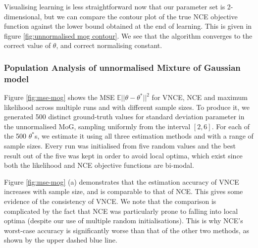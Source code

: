 \documentclass[11pt, oneside]{article}
\theoremstyle{definition}
\begin{document}
Visualising learning is less straightforward now that our parameter set is 2-dimensional, but we can compare the contour plot of the true NCE objective function against the lower bound obtained at the end of learning. This is given in figure \ref{fig:unnormalised mog contour}. We see that the algorithm converges to the correct value of $\theta$, and correct normalising constant.


\subsubsection{Population Analysis of unnormalised Mixture of Gaussian model}

Figure \ref{fig:mse-mog} shows the MSE $\mathbb{E} ||\theta - \theta^*||^2$ for VNCE, NCE and maximum likelihood across multiple runs and with different sample sizes. To produce it, we generated 500 distinct ground-truth values for standard deviation parameter in the unnormalised MoG, sampling uniformly from the interval $[2, 6]$. For each of the 500 $\theta^*$s, we estimate it using all three estimation methods and with a range of sample sizes. Every run was initialised from five random values and the best result out of the five was kept in order to avoid local optima, which exist since both the likelihood and NCE objective functions are bi-modal.

Figure \ref{fig:mse-mog} (a) demonstrates that the estimation accuracy of VNCE increases with sample size, and is comparable to that of NCE. This gives some evidence of the consistency of VNCE. We note that the comparison is complicated by the fact that NCE was particularly prone to falling into local optima (despite our use of multiple random initialisations). This is why NCE's worst-case accuracy is significantly worse than that of the other two methods, as shown by the upper dashed blue line.
\end{document}
